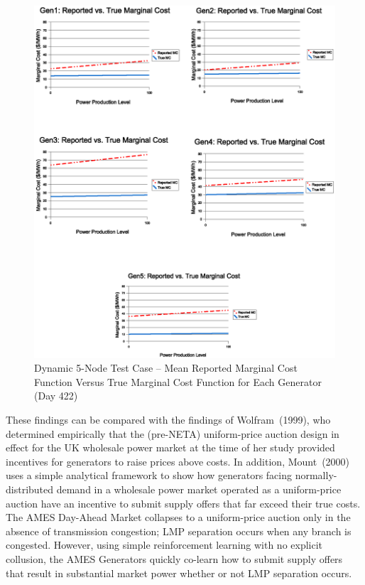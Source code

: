 \documentclass[12pt]{article}
\begin{document}

\begin{figure}
	\centering
		\includegraphics[totalheight = 20cm]{AMES.Results.MCs.eps}
	\caption{Dynamic 5-Node Test Case -- Mean Reported Marginal Cost Function Versus True Marginal Cost Function for Each Generator (Day 422)}
	\label{fig:MCs}
\end{figure} 


These findings can be compared with the findings of Wolfram~(1999), who determined empirically that the (pre-NETA) uniform-price auction design in effect for the UK wholesale power market at the time of her study provided incentives for generators to raise prices above costs.  In addition, Mount~(2000) uses a simple analytical framework to show how generators facing normally-distributed demand in a wholesale power market operated as a uniform-price auction have an incentive to submit supply offers that far exceed their true costs.
The AMES Day-Ahead Market collapses to a uniform-price auction only in the absence of transmission congestion; LMP separation occurs when any branch is congested.  However, using simple reinforcement learning with no explicit collusion, the AMES Generators quickly co-learn how to submit supply offers that result in substantial market power whether or not LMP separation occurs.
\end{document}
